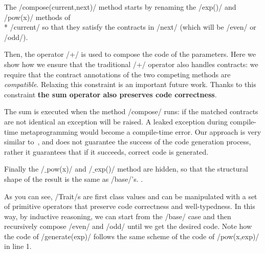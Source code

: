 
The /compose(current,next)/ method starts by renaming the /exp()/ and /pow(x)/ methods of\\* /current/
so that they satisfy the contracts in /next/ (which will be 
/even/ or /odd/).

Then, the operator /+/ is used to compose the code of the parameters.
Here we show how we ensure that the traditional /+/ operator also handles contracts: we require that the contract annotations of the two competing methods are \emph{compatible}.
 Relaxing this constraint is an important future work.
Thanks to this constraint \textbf{the sum operator also preserves code correctness}. %

The sum is executed when the method /compose/
runs: if the matched contracts are not identical an exception will be raised. A leaked exception during compile-time metaprogramming would become a compile-time error. 
Our approach is very similar to~\cite{servetto2014meta}, and does not guarantee the success of the code generation process, rather it guarantees that if it succeeds, correct code is generated.


Finally the /$\_$pow(x)/ and /$\_$exp()/ method are hidden, so that the structural shape of the result is
the same as /base/'s.
.

As you can see, /Trait/s are first class values and can be manipulated with a set of primitive operators that preserve code correctness and well-typedness.
In this way, by inductive reasoning, we can start from the /base/ case and then recursively compose /even/ and /odd/ until we get the desired code.
Note how the code of /generate(exp)/ follows the same scheme of the code of /pow(x,exp)/ in line 1.

